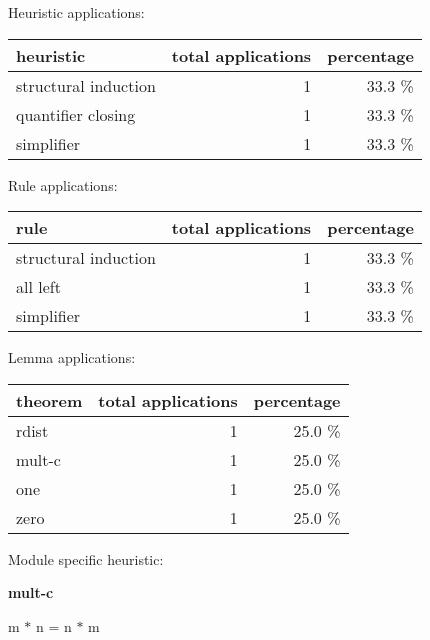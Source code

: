 \documentclass[a4paper]{article}
\begin{document}
\medskip


Heuristic applications:

\begin{supertabular}{l|r|r}
heuristic	& total applications & percentage \\ \hline
structural induction & 1 & 33.3 \% \\
quantifier closing & 1 & 33.3 \% \\
simplifier & 1 & 33.3 \% \\

\end{supertabular}

Rule applications:

\begin{supertabular}{l|r|r}
rule	        & total applications & percentage \\ \hline
structural induction & 1 & 33.3 \% \\
all left & 1 & 33.3 \% \\
simplifier & 1 & 33.3 \% \\

\end{supertabular}

Lemma applications:

\begin{supertabular}{l|r|r}
theorem	        & total applications & percentage \\ \hline
rdist & 1 & 25.0 \% \\
mult-c & 1 & 25.0 \% \\
one & 1 & 25.0 \% \\
zero & 1 & 25.0 \% \\

\end{supertabular}

Module specific heuristic:

\pagebreak

{\LARGE\bf mult-c}\label{lemma-mult-c}

\medskip

 \Fol m $*$ n = n $*$ m
\end{document}
